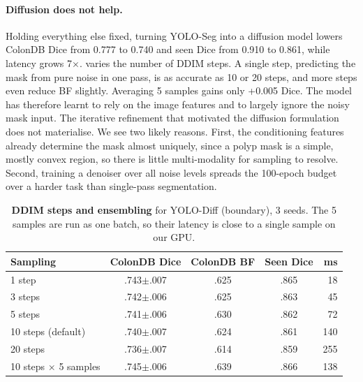 \documentclass[10pt,twocolumn,letterpaper]{article}
\newcommand{\pmstd}[1]{{\scriptsize$\pm$#1}}
\begin{document}
\paragraph{Diffusion does not help.} Holding everything else fixed, turning YOLO-Seg into a diffusion model lowers ColonDB Dice from 0.777 to 0.740 and seen Dice from 0.910 to 0.861, while latency grows 7$\times$.  varies the number of DDIM steps. A single step, \ie predicting the mask from pure noise in one pass, is as accurate as 10 or 20 steps, and more steps even reduce BF slightly. Averaging 5 samples gains only +0.005 Dice. The model has therefore learnt to rely on the image features and to largely ignore the noisy mask input. The iterative refinement that motivated the diffusion formulation does not materialise. We see two likely reasons. First, the conditioning features already determine the mask almost uniquely, since a polyp mask is a simple, mostly convex region, so there is little multi-modality for sampling to resolve. Second, training a denoiser over all noise levels spreads the 100-epoch budget over a harder task than single-pass segmentation.

\begin{table}[t]
\centering
\footnotesize
\setlength{\tabcolsep}{4pt}
\begin{tabular}{@{}lcccr@{}}
\toprule
Sampling & ColonDB Dice & ColonDB BF & Seen Dice & ms \\
\midrule
1 step & .743\pmstd{.007} & .625 & .865 & 18 \\
3 steps & .742\pmstd{.006} & .625 & .863 & 45 \\
5 steps & .741\pmstd{.006} & .630 & .862 & 72 \\
10 steps (default) & .740\pmstd{.007} & .624 & .861 & 140 \\
20 steps & .736\pmstd{.007} & .614 & .859 & 255 \\
10 steps $\times$ 5 samples & .745\pmstd{.006} & .639 & .866 & 138 \\
\bottomrule
\end{tabular}
\caption{\textbf{DDIM steps and ensembling} for YOLO-Diff (boundary), 3 seeds. The 5 samples are run as one batch, so their latency is close to a single sample on our GPU.}
\label{tab:sweep}
\end{table}
\end{document}
